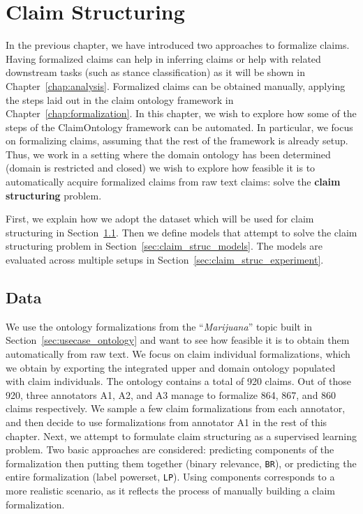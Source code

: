 \chapter{Claim Structuring}
\label{chap:claim_structuring}

In the previous chapter, we have introduced two approaches to formalize 
claims.  Having formalized claims can help in inferring claims
or help with related downstream tasks (such as stance classification) as it
will be shown in Chapter~\ref{chap:analysis}.
Formalized claims can be obtained manually, applying the steps laid out in the 
claim ontology framework in Chapter~\ref{chap:formalization}. 
In this chapter, we wish to explore how some of the steps of the ClaimOntology
framework can be automated. 
In particular, we focus on formalizing 
claims, assuming that the rest of the framework is already setup. 
Thus, we work in a setting where the domain ontology has been determined (domain is
restricted and closed) we wish to explore how feasible it is to automatically
acquire formalized claims from raw text claims: solve the \textbf{claim structuring}
problem.

First, we explain how we adopt the dataset which will be used for claim
structuring in Section~\ref{sec:claim_struc_data}.  Then we define models that
attempt to solve the claim structuring problem in
Section~\ref{sec:claim_struc_models}.  The models are evaluated across multiple
setups in Section~\ref{sec:claim_struc_experiment}.  

\section{Data}
\label{sec:claim_struc_data}

We use the ontology formalizations from the 
``\emph{Marijuana}'' topic built in Section~\ref{sec:usecase_ontology} and 
want to see how feasible it is to obtain them automatically from raw text.
We focus on claim individual formalizations, which we obtain by exporting
the integrated upper and domain ontology populated with claim individuals. 
The ontology contains a total of 920 claims. Out of those 920, three annotators 
A1, A2, and A3 manage to formalize 864, 867, and 860 claims respectively.
We sample a few claim formalizations from each annotator, and then 
decide to use formalizations from annotator A1 in the rest of this chapter. 
Next, we attempt to formulate claim structuring as a supervised learning
problem. Two basic approaches are considered: predicting components of the
formalization then putting them together (binary relevance, \texttt{BR}), or
predicting the entire formalization (label powerset, \texttt{LP}). 
Using components corresponds to a more realistic scenario, as it reflects 
the process of manually building a claim formalization. 

